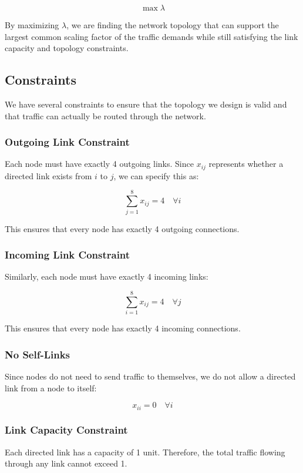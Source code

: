 \documentclass[11pt]{article}
\theoremstyle{definition}
\begin{document}
\[
\boxed{\max \lambda}
\]

By maximizing $\lambda$, we are finding the network topology that can support the largest common scaling factor of the traffic demands while still satisfying the link capacity and topology constraints.

\subsection{Constraints}

We have several constraints to ensure that the topology we design is valid and that traffic can actually be routed through the network.

\subsubsection{Outgoing Link Constraint}

Each node must have exactly 4 outgoing links. Since $x_{ij}$ represents whether a directed link exists from $i$ to $j$, we can specify this as:

\[
\sum_{j=1}^{8} x_{ij} = 4 \quad \forall i
\]

This ensures that every node has exactly 4 outgoing connections.

\subsubsection{Incoming Link Constraint}

Similarly, each node must have exactly 4 incoming links:

\[
\sum_{i=1}^{8} x_{ij} = 4 \quad \forall j
\]

This ensures that every node has exactly 4 incoming connections.

\subsubsection{No Self-Links}

Since nodes do not need to send traffic to themselves, we do not allow a directed link from a node to itself:

\[
x_{ii} = 0 \quad \forall i
\]

\subsubsection{Link Capacity Constraint}

Each directed link has a capacity of 1 unit. Therefore, the total traffic flowing through any link cannot exceed 1.
\end{document}
